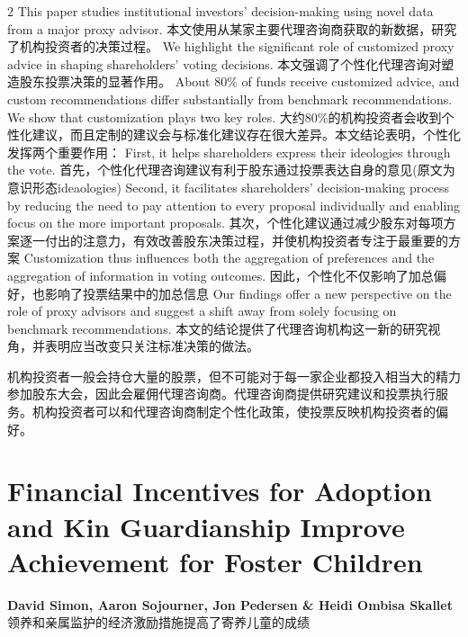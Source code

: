\documentclass[cn,hazy,blue,14pt,screen]{elegantnote}
\begin{document}
\begin{paracol}{2}
	This paper studies institutional investors’ decision-making using novel data from a major proxy advisor. 
	\switchcolumn
	本文使用从某家主要代理咨询商获取的新数据，研究了机构投资者的决策过程。
	\switchcolumn*
	We highlight the significant role of customized proxy advice in shaping shareholders’ voting decisions. 
	\switchcolumn
	本文强调了个性化代理咨询对塑造股东投票决策的显著作用。
	\switchcolumn*
	About 80\% of funds receive customized advice, and custom recommendations differ substantially from benchmark recommendations. We show that customization plays two key roles. 
	\switchcolumn
	大约80\%的机构投资者会收到个性化建议，而且定制的建议会与标准化建议存在很大差异。本文结论表明，个性化发挥两个重要作用：
	\switchcolumn*
	First, it helps shareholders express their ideologies through the vote.
	\switchcolumn
	首先，个性化代理咨询建议有利于股东通过投票表达自身的意见(原文为意识形态ideaologies)
	\switchcolumn*
	Second, it facilitates shareholders’ decision-making process by reducing the need to pay attention to every proposal individually and enabling focus on the more important proposals. 
	\switchcolumn
	其次，个性化建议通过减少股东对每项方案逐一付出的注意力，有效改善股东决策过程，并使机构投资者专注于最重要的方案
	\switchcolumn*
	Customization thus influences both the aggregation of preferences and the aggregation of information in voting outcomes. 
	\switchcolumn
	因此，个性化不仅影响了加总偏好，也影响了投票结果中的加总信息
	\switchcolumn*
	Our findings offer a new perspective on the role of proxy advisors and suggest a shift away from solely focusing on benchmark recommendations.
	\switchcolumn
	本文的结论提供了代理咨询机构这一新的研究视角，并表明应当改变只关注标准决策的做法。
	
	机构投资者一般会持仓大量的股票，但不可能对于每一家企业都投入相当大的精力参加股东大会，因此会雇佣代理咨询商。代理咨询商提供研究建议和投票执行服务。机构投资者可以和代理咨询商制定个性化政策，使投票反映机构投资者的偏好。
\end{paracol}

\section{Financial Incentives for Adoption and Kin Guardianship Improve Achievement for Foster Children}
\begin{center}
	\textbf{David Simon, Aaron Sojourner, Jon Pedersen \& Heidi Ombisa Skallet}\\
	领养和亲属监护的经济激励措施提高了寄养儿童的成绩
\end{center}
\end{document}

